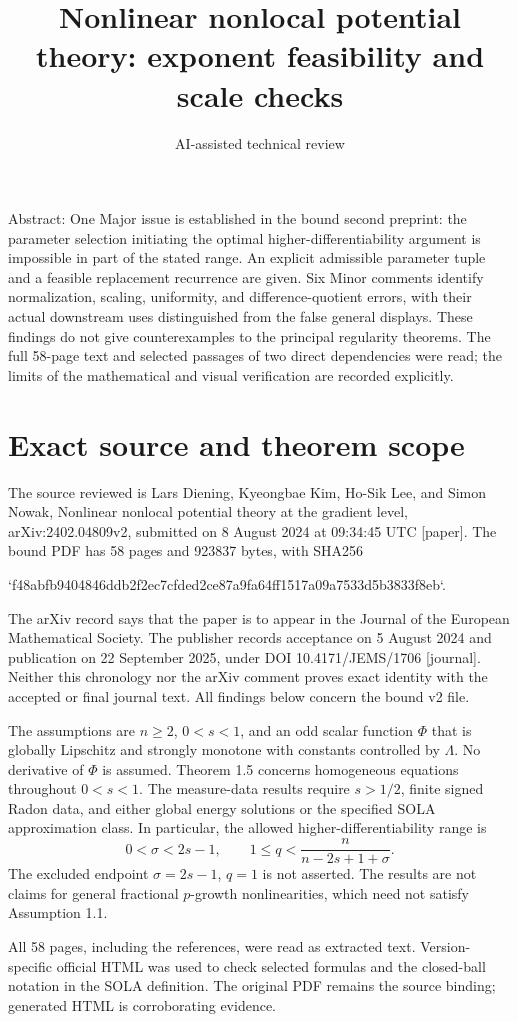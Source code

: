 \documentclass[10pt]{article}
\title{Nonlinear nonlocal potential theory: exponent feasibility and scale checks}
\author{AI-assisted technical review}
\date{}
\begin{document}
\maketitle
Abstract: One Major issue is established in the bound second preprint: the parameter selection initiating the optimal higher-differentiability argument is impossible in part of the stated range. An explicit admissible parameter tuple and a feasible replacement recurrence are given. Six Minor comments identify normalization, scaling, uniformity, and difference-quotient errors, with their actual downstream uses distinguished from the false general displays. These findings do not give counterexamples to the principal regularity theorems. The full 58-page text and selected passages of two direct dependencies were read; the limits of the mathematical and visual verification are recorded explicitly.\par
\section*{Exact source and theorem scope}
The source reviewed is Lars Diening, Kyeongbae Kim, Ho-Sik Lee, and Simon Nowak, Nonlinear nonlocal potential theory at the gradient level, arXiv:2402.04809v2, submitted on 8 August 2024 at 09:34:45 UTC [paper]. The bound PDF has 58 pages and 923837 bytes, with SHA256\par
`f48abfb9404846ddb2f2ec7cfded2ce87a9fa64ff1517a09a7533d5b3833f8eb`.\par
The arXiv record says that the paper is to appear in the Journal of the European Mathematical Society. The publisher records acceptance on 5 August 2024 and publication on 22 September 2025, under DOI 10.4171/JEMS/1706 [journal]. Neither this chronology nor the arXiv comment proves exact identity with the accepted or final journal text. All findings below concern the bound v2 file.\par
The assumptions are \(n\geq2\), \(0<s<1\), and an odd scalar function \(\Phi\) that is globally Lipschitz and strongly monotone with constants controlled by \(\Lambda\). No derivative of \(\Phi\) is assumed. Theorem 1.5 concerns homogeneous equations throughout \(0<s<1\). The measure-data results require \(s>1/2\), finite signed Radon data, and either global energy solutions or the specified SOLA approximation class. In particular, the allowed higher-differentiability range is \[0<\sigma<2s-1,\qquad
 1\leq q<\frac{n}{n-2s+1+\sigma}.\] The excluded endpoint \(\sigma=2s-1\), \(q=1\) is not asserted. The results are not claims for general fractional \(p\)-growth nonlinearities, which need not satisfy Assumption 1.1.\par
All 58 pages, including the references, were read as extracted text. Version-specific official HTML was used to check selected formulas and the closed-ball notation in the SOLA definition. The original PDF remains the source binding; generated HTML is corroborating evidence.\par
\end{document}
